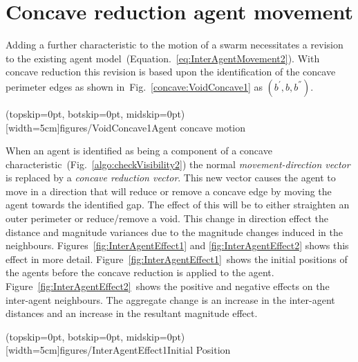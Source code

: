 \documentclass{ieeeaccess}
\begin{document}
\section{Concave reduction agent movement}\label{concave:AgentMovement}
Adding a further characteristic to the motion of a swarm necessitates a revision to the existing agent model~(Equation.~\ref{eq:InterAgentMovement2}). With concave reduction this revision is based upon the identification of the concave perimeter edges as shown in~Fig.~\ref{concave:VoidConcave1} as $(b^{'},b,b^{''})$. 

\Figure[t!](topskip=0pt, botskip=0pt, midskip=0pt)[width=5cm]{figures/VoidConcave1}{Agent concave motion\label{concave:VoidConcave1}}

When an agent is identified as being a component of a concave characteristic~(Fig.~\ref{algo:checkVisibility2}) the normal \textit{movement-direction vector} is replaced by a \textit{concave reduction vector}. This new vector causes the agent to move in a direction that will reduce or remove a concave edge by moving the agent towards the identified gap. The effect of this will be to either straighten an outer perimeter or reduce/remove a void. This change in direction effect the distance and magnitude variances due to the magnitude changes induced in the neighbours. Figures~\ref{fig:InterAgentEffect1} and \ref{fig:InterAgentEffect2} shows this effect in more detail. Figure~\ref{fig:InterAgentEffect1}~shows the initial positions of the agents before the concave reduction is applied to the agent. Figure~\ref{fig:InterAgentEffect2}~shows the positive and negative effects on the inter-agent neighbours. The aggregate change is an increase in the inter-agent distances and an increase in the resultant magnitude effect.

\Figure[t!](topskip=0pt, botskip=0pt, midskip=0pt)[width=5cm]{figures/InterAgentEffect1}{Initial Position\label{fig:InterAgentEffect1}}
\end{document}
